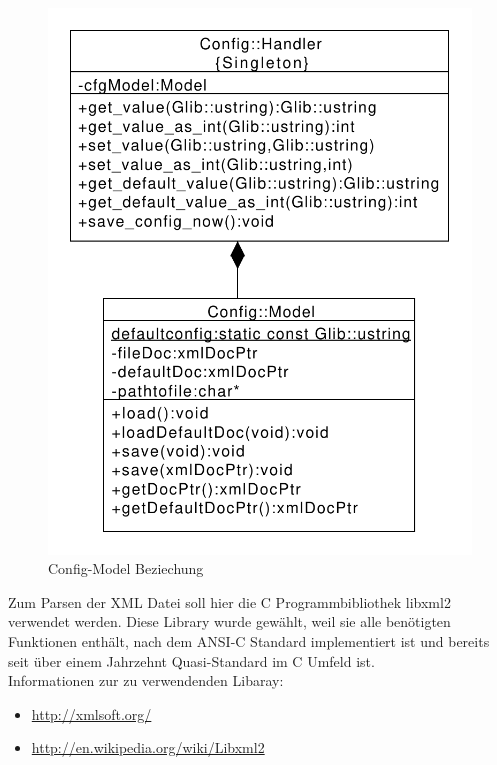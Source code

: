 \begin{figure}[htb!]
	\centering
  	\includegraphics[scale=0.6]{configClass.pdf}
	\caption{Config-Model Beziechung}
	\label{c_confmod}
\end{figure}


Zum Parsen der XML Datei soll hier die C Programmbibliothek libxml2 verwendet werden. Diese Library wurde gewählt, weil sie alle benötigten Funktionen enthält, nach dem ANSI-C Standard implementiert ist
und bereits seit über einem Jahrzehnt Quasi-Standard im C Umfeld ist.
\\
Informationen zur zu verwendenden Libaray:
\begin{itemize}
    \item \url{http://xmlsoft.org/}
    \item \url{http://en.wikipedia.org/wiki/Libxml2}
\end{itemize}




